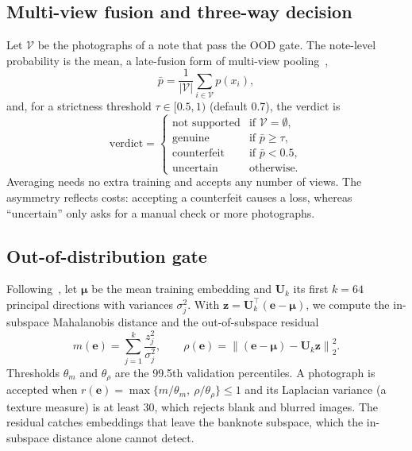 \documentclass[pdflatex,sn-mathphys-num]{sn-jnl}
\begin{document}
\subsection{Multi-view fusion and three-way decision}\label{sec:decision}

Let $\mathcal{V}$ be the photographs of a note that pass the OOD gate. The note-level
probability is the mean, a late-fusion form of multi-view pooling~\cite{su2015mvcnn},
\begin{equation}
\bar{p} = \frac{1}{|\mathcal{V}|}\sum_{i\in\mathcal{V}} p(x_i),
\label{eq:fusion}
\end{equation}
and, for a strictness threshold $\tau\in[0.5,1)$ (default 0.7), the verdict is
\begin{equation}
\text{verdict} =
\begin{cases}
\text{not supported} & \text{if } \mathcal{V}=\emptyset,\\
\text{genuine} & \text{if } \bar{p}\ge\tau,\\
\text{counterfeit} & \text{if } \bar{p}<0.5,\\
\text{uncertain} & \text{otherwise.}
\end{cases}
\label{eq:decision}
\end{equation}
Averaging needs no extra training and accepts any number of views. The asymmetry
reflects costs: accepting a counterfeit causes a loss, whereas ``uncertain'' only asks
for a manual check or more photographs.

\subsection{Out-of-distribution gate}\label{sec:ood}

Following~\cite{lee2018mahalanobis}, let $\boldsymbol{\mu}$ be the mean training
embedding and $\mathbf{U}_k$ its first $k=64$ principal directions with variances
$\sigma_j^2$. With $\mathbf{z}=\mathbf{U}_k^{\top}(\mathbf{e}-\boldsymbol{\mu})$, we
compute the in-subspace Mahalanobis distance and the out-of-subspace residual
\begin{equation}
m(\mathbf{e}) = \sum_{j=1}^{k}\frac{z_j^2}{\sigma_j^2},\qquad
\rho(\mathbf{e}) = \left\lVert(\mathbf{e}-\boldsymbol{\mu})-\mathbf{U}_k\mathbf{z}\right\rVert_2^2 .
\label{eq:ood}
\end{equation}
Thresholds $\theta_m$ and $\theta_\rho$ are the 99.5th validation percentiles. A
photograph is accepted when $r(\mathbf{e})=\max\{m/\theta_m,\ \rho/\theta_\rho\}\le1$
and its Laplacian variance (a texture measure) is at least 30, which rejects blank and
blurred images. The residual catches embeddings that leave the banknote subspace, which
the in-subspace distance alone cannot detect.
\end{document}
